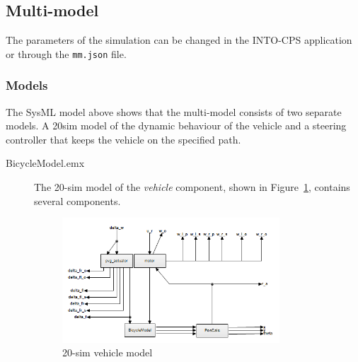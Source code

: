 \subsection{Multi-model}
\label{sec:bicycle_mm}
The parameters of the simulation can be changed in the INTO-CPS application or through the \texttt{mm.json} file.  
\subsubsection{Models}
\label{sec:bicycle_models}
The SysML model above shows that the multi-model consists of two separate models. A 20sim model of the dynamic behaviour of the vehicle and a steering controller that keeps the vehicle on the specified path. 

\begin{description}
	\item[BicycleModel.emx] The 20-sim model of the \emph{vehicle} component, shown in Figure~\ref{fig:vehicle_20sim}, contains several components. 	
	\begin{figure}[htbp]
		\begin{center}
			\includegraphics[width=0.8\textwidth]{vehicle/vehicle.png}
			\caption{20-sim vehicle model}
			\label{fig:vehicle_20sim}
		\end{center}
	\end{figure}


\end{description}
